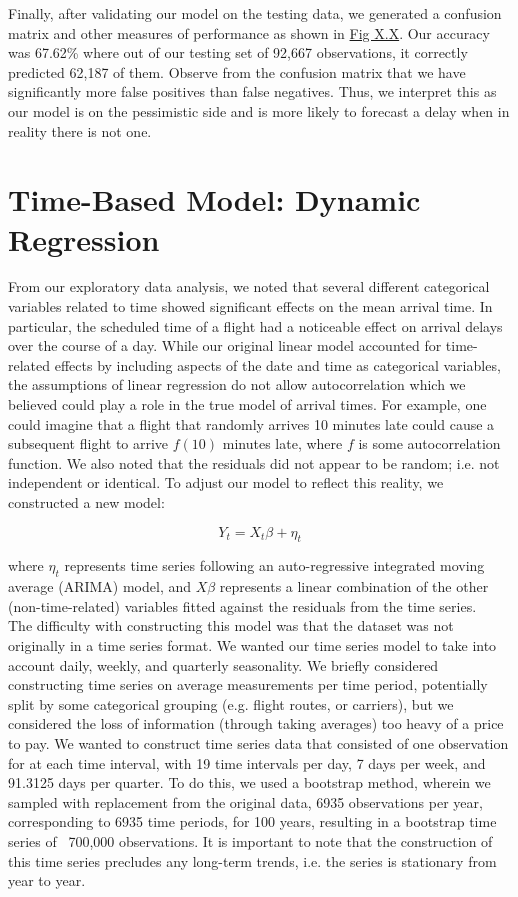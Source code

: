 \documentclass[12pt, a4paper, openany]{book}
\newcommand\tab[1][1cm]{\hspace*{#1}}
\begin{document}
	\tab Finally, after validating our model on the testing data, we generated a confusion matrix and other measures of performance as shown in \underline{Fig X.X}. Our accuracy was 67.62\% where out of our testing set of 92,667 observations, it correctly predicted 62,187 of them. Observe from the confusion matrix that we have significantly more false positives than false negatives. Thus, we interpret this as our model is on the pessimistic side and is more likely to forecast a delay when in reality there is not one. \\

	\section{Time-Based Model: Dynamic Regression}
	\tab From our exploratory data analysis, we noted that several different categorical variables related to time showed significant effects on the mean arrival time. In particular, the scheduled time of a flight had a noticeable effect on arrival delays over the course of a day. While our original linear model accounted for time-related effects by including aspects of the date and time as categorical variables, the assumptions of linear regression do not allow autocorrelation which we believed could play a role in the true model of arrival times.  For example, one could imagine that a flight that randomly arrives 10 minutes late could cause a subsequent flight to arrive $f(10)$ minutes late, where $f$ is some autocorrelation function. We also noted that the residuals did not appear to be random; i.e. not independent or identical. To adjust our model to reflect this reality, we constructed a new model: 
	\begin{center}
	$$Y_t = X_t\beta + \eta_t$$
	\end{center}
	where $\eta_t$ represents time series following an auto-regressive integrated moving average (ARIMA) model, and $X\beta$ represents a linear combination of the other (non-time-related) variables fitted against the residuals from the time series. \\
	\tab The difficulty with constructing this model was that the dataset was not originally in a time series format. We wanted our time series model to take into account daily, weekly, and quarterly seasonality. We briefly considered constructing time series on average measurements per time period, potentially split by some categorical grouping (e.g. flight routes, or carriers), but we considered the loss of information (through taking averages) too heavy of a price to pay. We wanted to construct time series data that consisted of one observation for at each time interval, with 19 time intervals per day, 7 days per week, and 91.3125 days per quarter. To do this, we used a bootstrap method, wherein we sampled with replacement from the original data, 6935 observations per year, corresponding to 6935 time periods, for 100 years, resulting in a bootstrap time series of ~700,000 observations. It is important to note that the construction of this time series precludes any long-term trends, i.e. the series is stationary from year to year. \\
\end{document}
